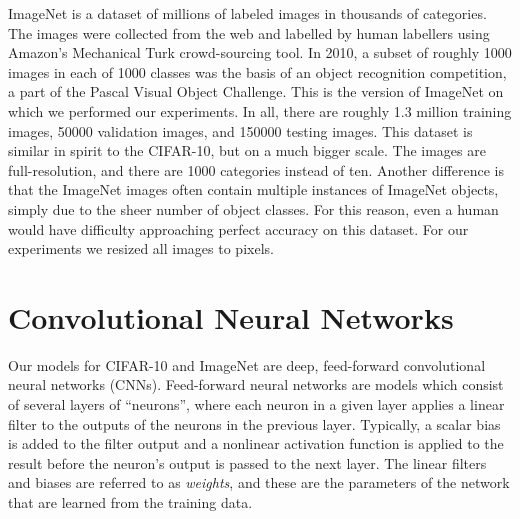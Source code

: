 \documentclass[12pt]{article}
\begin{document}
ImageNet is a dataset of millions of labeled images in thousands of
categories. The images were collected from the web and labelled by
human labellers using Amazon's Mechanical Turk crowd-sourcing tool.
In 2010, a subset of roughly 1000 images in each of 1000 classes was
the basis of an object recognition competition, a part of the Pascal
Visual Object Challenge. This is the version of ImageNet on which
we performed our experiments. In all, there are roughly 1.3 million
training images, 50000 validation images, and 150000 testing images.
This dataset is similar in spirit to the CIFAR-10, but on a much bigger
scale. The images are full-resolution, and there are 1000 categories
instead of ten. Another difference is that the ImageNet images often
contain multiple instances of ImageNet objects, simply due to the
sheer number of object classes. For this reason, even a human would
have difficulty approaching perfect accuracy on this dataset. For
our experiments we resized all images to  pixels.

\section{Convolutional Neural Networks}

Our models for CIFAR-10 and ImageNet are deep, feed-forward convolutional
neural networks (CNNs). Feed-forward neural networks are models which
consist of several layers of {}``neurons'', where each neuron in
a given layer applies a linear filter to the outputs of the neurons
in the previous layer. Typically, a scalar bias is added to the filter
output and a nonlinear activation function is applied to the result
before the neuron's output is passed to the next layer. The linear
filters and biases are referred to as \emph{weights}, and these are
the parameters of the network that are learned from the training data.
\end{document}
